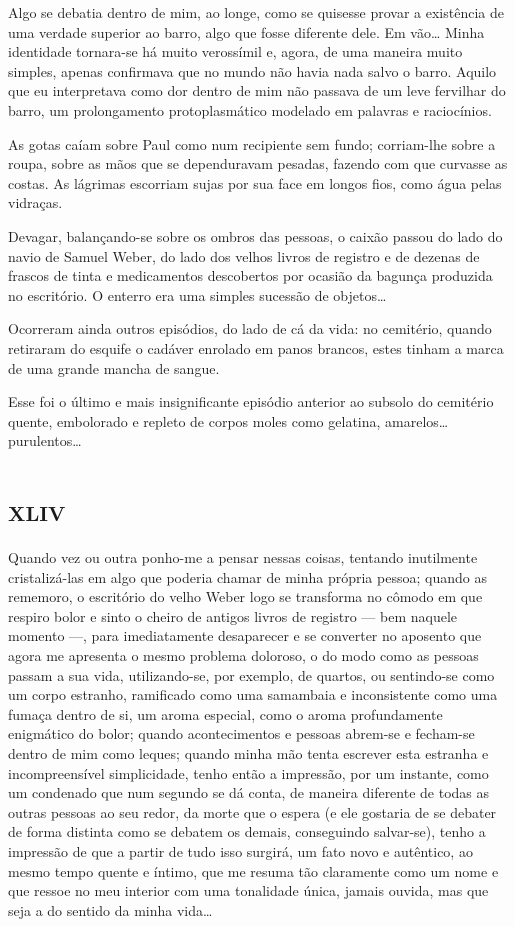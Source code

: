 Algo se debatia dentro de mim, ao longe, como se quisesse provar a existência de uma verdade superior ao barro, algo que fosse diferente dele. Em vão\ldots{} Minha identidade tornara-se há muito verossímil e, agora, de uma maneira muito simples, apenas confirmava que no mundo não havia nada salvo o barro. Aquilo que eu interpretava como dor dentro de mim não passava de um leve fervilhar do barro, um prolongamento protoplasmático modelado em palavras e raciocínios.

As gotas caíam sobre Paul como num recipiente sem fundo; corriam-lhe sobre a roupa, sobre as mãos que se dependuravam pesadas, fazendo com que curvasse as costas. As lágrimas escorriam sujas por sua face em longos fios, como água pelas vidraças.

Devagar, balançando-se sobre os ombros das pessoas, o caixão passou do lado do navio de Samuel Weber, do lado dos velhos livros de registro e de dezenas de frascos de tinta e medicamentos descobertos por ocasião da bagunça produzida no escritório. O enterro era uma simples sucessão de objetos\ldots{}

Ocorreram ainda outros episódios, do lado de cá da vida: no cemitério, quando retiraram do esquife o cadáver enrolado em panos brancos,  estes tinham a marca de uma grande mancha de sangue.

Esse foi o último e mais insignificante episódio anterior ao subsolo do cemitério quente, embolorado e repleto de corpos moles como gelatina, amarelos\ldots{} purulentos\ldots{}


\chapter*{\huge\centering\textsc{xliv}}

Quando vez ou outra ponho-me a pensar nessas coisas, tentando inutilmente cristalizá-las em algo que poderia chamar de minha própria pessoa; quando as rememoro, o escritório do velho Weber logo se transforma no cômodo em que respiro bolor e sinto o cheiro de antigos livros de registro --- bem naquele momento ---, para imediatamente desaparecer e se converter no aposento que agora me apresenta o mesmo problema doloroso, o do modo como as pessoas passam a sua vida, utilizando-se, por exemplo, de quartos, ou sentindo-se como um corpo estranho, ramificado como uma samambaia e inconsistente como uma fumaça dentro de si, um aroma especial, como o aroma profundamente enigmático do bolor; quando acontecimentos e pessoas abrem-se e fecham-se dentro de mim como leques; quando minha mão tenta escrever esta estranha e incompreensível simplicidade, tenho então a impressão, por um instante, como um condenado que num segundo se dá conta, de maneira diferente de todas as outras pessoas ao seu redor, da morte que o espera (e ele gostaria de se debater de forma distinta como se debatem os demais, conseguindo salvar-se), tenho a impressão de que a partir de tudo isso surgirá, um fato novo e autêntico, ao mesmo tempo quente e íntimo, que me resuma tão claramente como um nome e que ressoe no meu interior com uma tonalidade única, jamais ouvida, mas que seja a do sentido da minha vida\ldots{}

